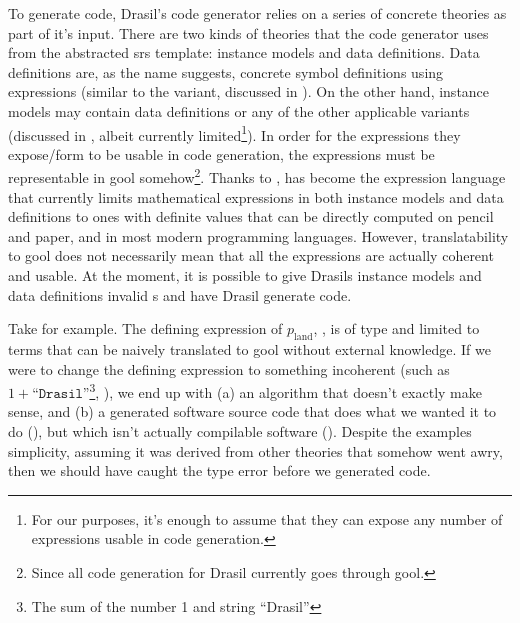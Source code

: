 To generate code, Drasil's code generator relies on a series of concrete
theories as part of it's input. There are two kinds of theories that the code
generator uses from the abstracted \acs{srs} template: instance models and data
definitions. Data definitions are, as the name suggests, concrete symbol
definitions using expressions (similar to the \EquationalModel{} \ModelKind{}
variant, discussed in
).
On the other hand, instance models may contain data definitions or any of the
other applicable \ModelKinds{} variants (discussed in
, albeit currently limited\footnote{For our
purposes, it's enough to assume that they can expose any number of expressions
usable in code generation.}). In order for the expressions they expose/form to
be usable in code generation, the expressions must be representable in
\acs{gool} somehow\footnote{Since all code generation for Drasil currently goes
through \acs{gool}.}. Thanks to , \Expr{} has become
the expression language that currently limits mathematical expressions in both
instance models and data definitions to ones with definite values that can be
directly computed on pencil and paper, and in most modern programming languages.
However, translatability to \acs{gool} does not necessarily mean that all the
expressions are actually coherent and usable. At the moment, it is possible to
give Drasils instance models and data definitions invalid \Expr{}s and have
Drasil generate code.

\pseudoExampleLandPosQDBadTyping{}

Take  for example. The defining expression of
\(p_\text{land}\), , is of type \Expr{} and limited to
terms that can be naively translated to \acs{gool} without external knowledge.
If we were to change the defining expression to something incoherent (such as
\(1 + \texttt{``Drasil''}\)\footnote{The sum of the number 1 and string
``Drasil''}, ), we end up with (a) an
algorithm that doesn't exactly make sense, and (b) a generated software source
code that does what we wanted it to do
(), but which isn't actually
compilable software ().
Despite the examples simplicity, assuming it was derived from other theories
that somehow went awry, then we should have caught the type error before we
generated code.

